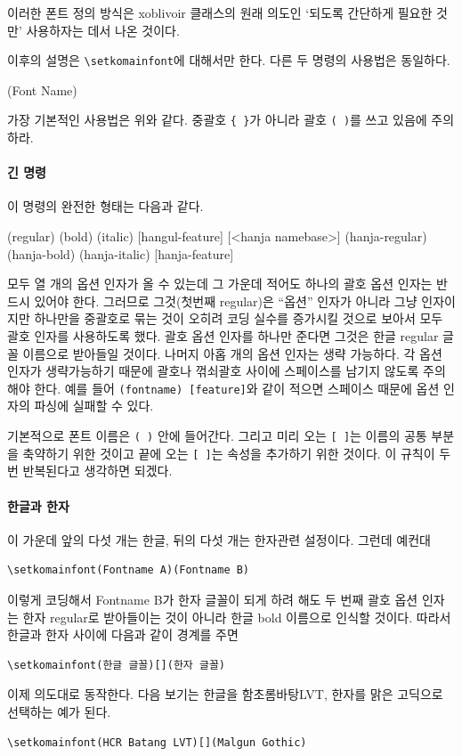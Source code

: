 \documentclass[
	12pt,
	a4paper,
	kosection,
	footnote,
	microtype,
	figtabcapt,
]{oblivoir}
\def\xetexko{\XeTeX-\ko}
\begin{document}
이러한 폰트 정의 방식은 xoblivoir 클래스의 원래 의도인 `되도록 간단하게
필요한 것만' 사용하자는 데서 나온 것이다.

이후의 설명은 \verb|\setkomainfont|에 대해서만 한다. 다른 두 명령의 사용법은 동일하다.
\begin{boxedverbatim}
\setkomainfont(Font Name)
\end{boxedverbatim}
가장 기본적인 사용법은 위와 같다. 중괄호 \verb|{ }|가 아니라 괄호 \verb|( )|를 쓰고 있음에 주의하라.

\paragraph{긴 명령}
이 명령의 완전한 형태는 다음과 같다.
\begin{boxedverbatim}
\setkomainfont[<namebase>]%
              (regular)%
              (bold)%
              (italic)%
              [hangul-feature]%
              [<hanja namebase>]%
              (hanja-regular)%
              (hanja-bold)%
              (hanja-italic)%
              [hanja-feature]
\end{boxedverbatim}
모두 열 개의 옵션 인자가 올 수 있는데 그 가운데 적어도 하나의 괄호 옵션 인자는 반드시 있어야 한다.
그러므로 그것(첫번째 regular)은 ``옵션'' 인자가 아니라 그냥 인자이지만 하나만을 중괄호로 묶는 것이 오히려 코딩 
실수를 증가시킬 것으로 보아서 모두 괄호 인자를 사용하도록 했다.
괄호 옵션 인자를 하나만 준다면 그것은 한글 regular 글꼴 이름으로 받아들일 것이다.
나머지 아홉 개의 옵션 인자는 생략 가능하다. 각 옵션 인자가 생략가능하기 때문에
괄호나 꺾쇠괄호 사이에 스페이스를 남기지 않도록 주의해야 한다. 예를 들어 \verb*|(fontname) [feature]|와 같이 
적으면 스페이스 때문에 옵션 인자의 파싱에 실패할 수 있다.

기본적으로 폰트 이름은 \verb|( )| 안에 들어간다. 그리고 미리 오는 \verb|[ ]|는 이름의 공통 부분을 축약하기 위한 것이고 끝에 오는 \verb|[ ]|는 속성을 추가하기 위한 것이다. 이 규칙이 두 번 반복된다고 생각하면 되겠다.

\paragraph{한글과 한자}
이 가운데 앞의 다섯 개는 한글, 뒤의 다섯 개는 한자관련 설정이다. 그런데 예컨대
\begin{verbatim}
\setkomainfont(Fontname A)(Fontname B)
\end{verbatim}
이렇게 코딩해서 Fontname B가 한자 글꼴이 되게 하려 해도
두 번째 괄호 옵션 인자는 한자 regular로 받아들이는 것이 아니라
한글 bold 이름으로 인식할 것이다.
따라서 한글과 한자 사이에 다음과 같이 경계를 주면
\begin{verbatim}
\setkomainfont(한글 글꼴)[](한자 글꼴)
\end{verbatim}
이제 의도대로 동작한다. 다음 보기는 한글을 함초롬바탕LVT, 한자를 맑은 고딕으로 선택하는 예가 된다.
\begin{verbatim}
\setkomainfont(HCR Batang LVT)[](Malgun Gothic)
\end{verbatim}
\end{document}
